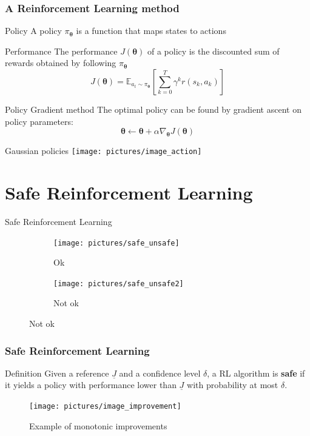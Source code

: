 \documentclass{beamer}
\newcommand{\vtheta}{{\boldsymbol{\theta}}}
\newcommand*{\gradj}{\nabla_{\vtheta}J(\vtheta)}
\begin{document}
\begin{frame}
\frametitle{A Reinforcement Learning method}
\begin{block}{Policy}
A policy $\pi_{\vtheta}$ is a function that maps states to actions
\end{block}

\begin{block}{Performance}
The performance $J(\vtheta)$ of a policy is the discounted sum of rewards obtained by following $\pi_{\vtheta}$
\[
J(\vtheta) = \mathbb{E}_{a_t \sim \pi_{\vtheta}}\left[ \sum_{k=0}^T \gamma^k r(s_k, a_k) \right]
\]
\end{block}

\begin{block}{Policy Gradient method}
The optimal policy can be found by gradient ascent on policy parameters: 
\[
\vtheta \gets \vtheta + \alpha \gradj
\]
\end{block}

\end{frame}



\begin{frame}{Gaussian policies}
\centering
\texttt{[image: pictures/image\_action]}
\end{frame}


\section{Safe Reinforcement Learning}

\begin{frame}{Safe Reinforcement Learning}
\begin{figure}
\begin{subfigure}[t]{0.495\textwidth}
\texttt{[image: pictures/safe\_unsafe]}
\caption{Ok}
\end{subfigure}
\hfill
\begin{subfigure}[t]{0.495\textwidth}
\texttt{[image: pictures/safe\_unsafe2]}
\caption{Not ok}
\end{subfigure}
\end{figure}
\end{frame}

\begin{frame}
\frametitle{Safe Reinforcement Learning}

\begin{block}{Definition}
Given a reference $\underline{J}$ and a confidence level $\delta$, a RL algorithm is \textbf{safe} if it yields a policy with performance lower than $\underline{J}$ with probability at most $\delta$.

\end{block}

\vfill
\begin{figure}
\centering
\texttt{[image: pictures/image\_improvement]}
\caption{Example of monotonic improvements}
\end{figure}


\end{frame}
\end{document}
